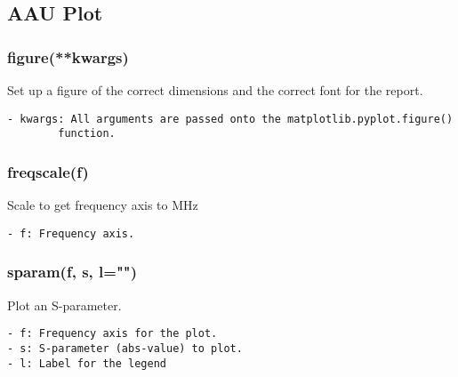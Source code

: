 \subsection{AAU Plot}
\subsubsection{figure(**kwargs)}
Set up a figure of the correct dimensions and the correct font for the
report.

\begin{verbatim}
- kwargs: All arguments are passed onto the matplotlib.pyplot.figure()
        function.
\end{verbatim}

\subsubsection{freqscale(f)}
Scale to get frequency axis to MHz

\begin{verbatim}
- f: Frequency axis.
\end{verbatim}

\subsubsection{sparam(f, s, l="")}
Plot an S-parameter.

\begin{verbatim}
- f: Frequency axis for the plot.
- s: S-parameter (abs-value) to plot.
- l: Label for the legend
\end{verbatim}

